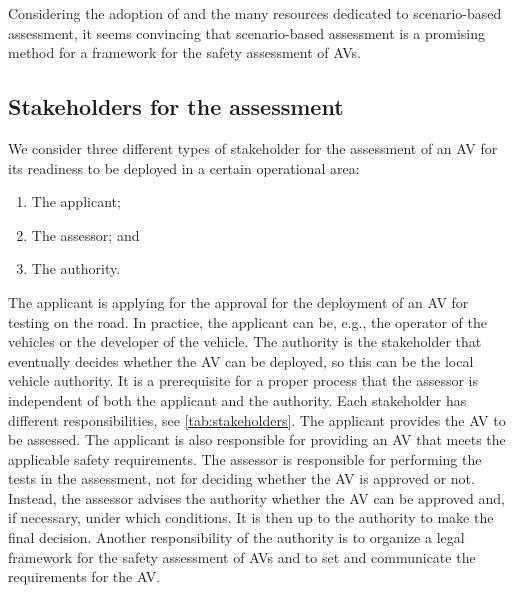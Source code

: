 Considering the adoption of and the many resources dedicated to scenario-based assessment, it seems convincing that scenario-based assessment is a promising method for a framework for the safety assessment of AVs.



\subsection{Stakeholders for the assessment}
\label{sec:stakeholders}

We consider three different types of stakeholder for the assessment of an AV for its readiness to be deployed in a certain operational area:
\begin{enumerate}
	\item The applicant;
	\item The assessor; and
	\item The authority.
\end{enumerate}

The applicant is applying for the approval for the deployment of an AV for testing on the road. In practice, the applicant can be, e.g., the operator of the vehicles or the developer of the vehicle. The authority is the stakeholder that eventually decides whether the AV can be deployed, so this can be the local vehicle authority. It is a prerequisite for a proper process that the assessor is independent of both the applicant and the authority.
Each stakeholder has different responsibilities, see \cref{tab:stakeholders}. The applicant provides the AV to be assessed. The applicant is also responsible for providing an AV that meets the applicable safety requirements. The assessor is responsible for performing the tests in the assessment, not for deciding whether the AV is approved or not. Instead, the assessor advises the authority whether the AV can be approved and, if necessary, under which conditions. It is then up to the authority to make the final decision. Another responsibility of the authority is to organize a legal framework for the safety assessment of AVs and to set and communicate the requirements for the AV.

